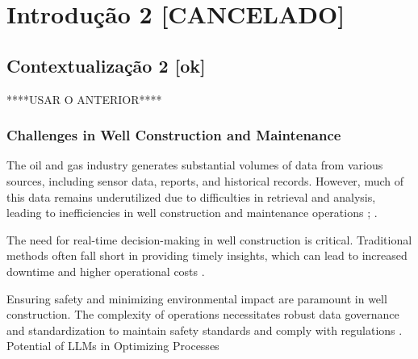 
\chapter{Introdução 2 [CANCELADO]} 


    \section{Contextualização 2 [ok]}

        
        ****USAR O ANTERIOR****

        
        \subsection{Challenges in Well Construction and Maintenance}
        
            The oil and gas industry generates substantial volumes of data from various sources, including sensor data, reports, and historical records. However, much of this data remains underutilized due to difficulties in retrieval and analysis, leading to inefficiencies in well construction and maintenance operations \cite{Michael_Yi_2024}; \cite{Myriam_Amour_2024}.
            
            The need for real-time decision-making in well construction is critical. Traditional methods often fall short in providing timely insights, which can lead to increased downtime and higher operational costs \cite{E_Ferrigno_2024}.
            
            Ensuring safety and minimizing environmental impact are paramount in well construction. The complexity of operations necessitates robust data governance and standardization to maintain safety standards and comply with regulations \cite{Syatria_Kumala_Putra_2024}.
            Potential of LLMs in Optimizing Processes
            
